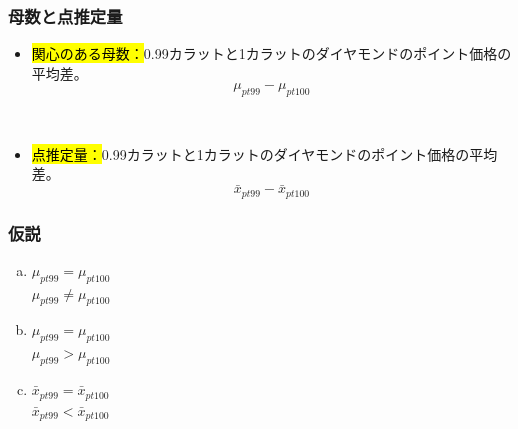 
\begin{frame}
\frametitle{母数と点推定量}

\begin{itemize}

\item \hl{関心のある母数：}0.99カラットと1カラットのダイヤモンドのポイント価格の平均差。
\[ \mu_{pt99} - \mu_{pt100} \]

$\:$ \\

\item \hl{点推定量：}0.99カラットと1カラットのダイヤモンドのポイント価格の平均差。
\[ \bar{x}_{pt99} - \bar{x}_{pt100} \]

\end{itemize}

\end{frame}


\begin{frame}
\frametitle{仮説}


\begin{enumerate}[(a)]

\item  {} $\mu_{pt99} = \mu_{pt100}$ \\
 $\mu_{pt99} \ne \mu_{pt100}$

\item  {} $\mu_{pt99} = \mu_{pt100}$ \\
 $\mu_{pt99} > \mu_{pt100}$


\item  {} $\bar{x}_{pt99} = \bar{x}_{pt100}$ \\
 $\bar{x}_{pt99} < \bar{x}_{pt100}$

\end{enumerate}

\end{frame}


